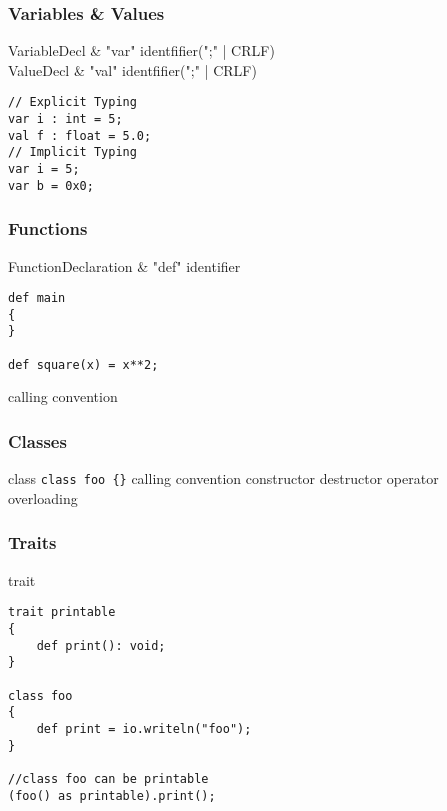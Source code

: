 \subsubsection*{Variables \& Values}
\begin{ebnf}
	VariableDecl & \rightarrow "var"\; identfifier\; [":" identifier] ["=" Literal] (";" | CRLF) \\
	ValueDecl & \rightarrow "val"\; identfifier\; [":" identifier] ["=" Literal] (";" | CRLF)
\end{ebnf}

\begin{lstlisting}
// Explicit Typing
var i : int = 5;
val f : float = 5.0;
// Implicit Typing
var i = 5;
var b = 0x0;

\end{lstlisting}

\subsubsection*{Functions}
\begin{ebnf}
FunctionDeclaration & \rightarrow "def"\; ["("\; Identifier\; ")"]\; identifier\; ["("\; ")" ]\; \\
\end{ebnf}

\begin{lstlisting}
def main
{
}

def square(x) = x**2;
\end{lstlisting}

calling convention

\subsubsection*{Classes}
class
\lstinline!class foo {}!
calling convention
constructor
destructor
operator overloading

\subsubsection*{Traits}
trait
\begin{lstlisting}
trait printable
{
	def print(): void;
}

class foo
{
	def print = io.writeln("foo");
}

//class foo can be printable
(foo() as printable).print();
\end{lstlisting}

